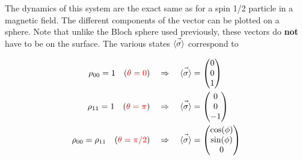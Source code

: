   \noindent The dynamics  of this system are  the exact same as  for a spin 1/2  particle in a
  magnetic  field.  The  different  components of  the  vector  \isigma can  be  plotted on  a
  sphere. Note  that unlike the  Bloch sphere used  previously, these vectors  do \textbf{not}
  have to be on the surface. The various states $ \vec{\left\langle \sigma \right\rangle} $ correspond to
  
  
  \begin{align}
    \rho_{00}=1 \quad({\color{red}{\theta = 0}}) & \quad\Rightarrow\quad \vec{\left\langle \sigma \right\rangle}  = \begin{pmatrix}0\\0\\1\end{pmatrix}\\
    \rho_{11}=1 \quad({\color{red}{\theta = \pi}})& \quad\Rightarrow\quad \vec{\left\langle \sigma \right\rangle}  = \begin{pmatrix}0\\0\\-1\end{pmatrix}\\
    \rho_{00}=\rho_{11}\quad ({\color{red}{\theta = \pi/2}})&\quad\Rightarrow\quad\vec{\left\langle \sigma \right\rangle}  = \begin{pmatrix}\cos(\phi)\\\sin(\phi)\\0\end{pmatrix}
  \end{align}
  
